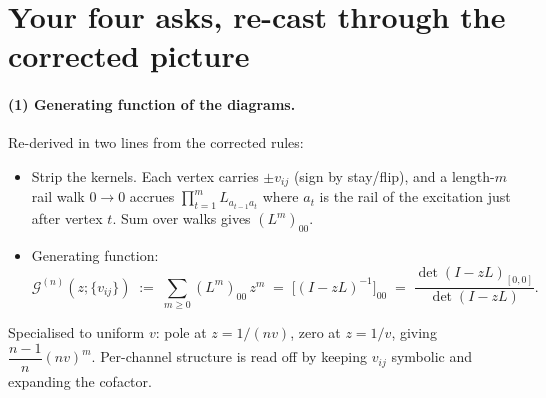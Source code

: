 \documentclass[11pt,a4paper]{article}
\begin{document}
\section{Your four asks, re-cast through the corrected picture}\label{sec:asks}

\paragraph{(1) Generating function of the diagrams.}
Re-derived in two lines from the corrected rules:
\begin{itemize}[leftmargin=2em,itemsep=2pt]
\item Strip the kernels. Each vertex carries $\pm v_{ij}$ (sign by
stay/flip), and a length-$m$ rail walk $0\!\to\!0$ accrues
$\prod_{t=1}^{m} L_{a_{t-1}a_{t}}$ where $a_{t}$ is the rail of the
excitation just after vertex $t$. Sum over walks gives $(L^{m})_{00}$.
\item Generating function:
\[
\mathcal G^{(n)}(z;\{v_{ij}\}) \;:=\;\sum_{m\geq 0}(L^{m})_{00}\,z^{m}
\;=\; \big[(I-zL)^{-1}\big]_{00}
\;=\; \frac{\det(I-zL)_{[0,0]}}{\det(I-zL)}.
\]
\end{itemize}
Specialised to uniform $v$: pole at $z{=}1/(nv)$, zero at $z{=}1/v$,
giving $\dfrac{n-1}{n}(nv)^{m}$. Per-channel structure is read off by
keeping $v_{ij}$ symbolic and expanding the cofactor.
\end{document}
